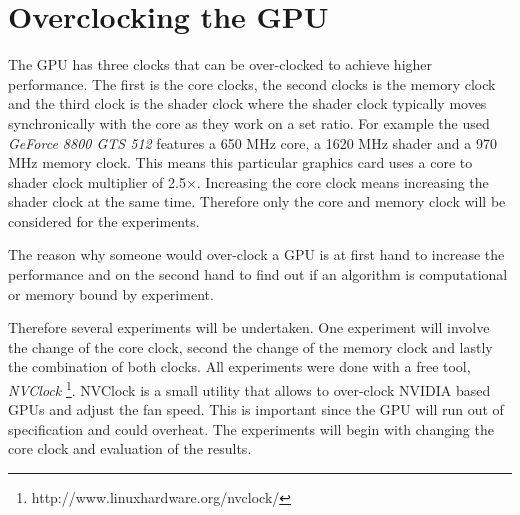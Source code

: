 
\section{Overclocking the GPU} %
\label{sec:overclocking_the_gpu}
The \gls{GPU} has three \glspl{clock} that can be over-clocked to achieve higher
performance. The first is the core \glspl{clock}, the second \glspl{clock} is
the memory clock and the third clock is the \gls{shader} \gls{clock} where the
shader clock typically moves synchronically with the core as they work on a set
ratio. For example the used \emph{GeForce 8800 GTS 512} features a 650 \gls{MHz}
core, a 1620 \gls{MHz} shader and a 970 \gls{MHz} memory clock. This means this
particular graphics card uses a core to shader \gls{clock} multiplier of
2.5$\times$. Increasing the core \gls{clock} means increasing the shader clock
at the same time. Therefore only the core and memory clock will be considered
for the experiments.

The reason why someone would over-clock a \gls{GPU} is at first hand to increase
the performance and on the second hand to find out if an algorithm is
computational or memory bound by experiment.

Therefore several experiments will be undertaken. One experiment will involve
the change of the core \gls{clock}, second the change of the memory \gls{clock}
and lastly the combination of both \glspl{clock}. All experiments were done with
a free tool, \emph{NVClock}
\footnote{http://www.linuxhardware.org/nvclock/}. NVClock is a small utility
that allows to over-clock NVIDIA based \glspl{GPU} and adjust the fan speed. This
is important since the \gls{GPU} will run out of specification and could overheat.
The experiments will begin with changing the core clock and evaluation of the
results. 

